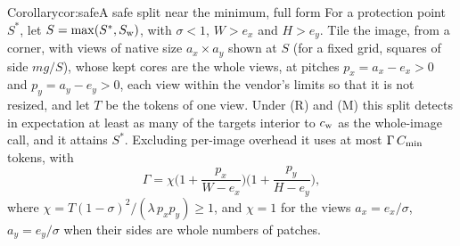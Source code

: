 \begin{restate}{Corollary}{cor:safe}{A safe split near the minimum, full form}
For a protection point $S^\ast$, let $S = \max(S^\ast, S_{\mathrm{w}})$, with $\sigma < 1$, $W > e_x$ and $H > e_y$. Tile the image, from a corner, with views of native size $a_x \times a_y$ shown at $S$ (for a fixed grid, squares of side $mg/S$), whose kept cores are the whole views, at pitches $p_x = a_x - e_x > 0$ and $p_y = a_y - e_y > 0$, each view within the vendor's limits so that it is not resized, and let $T$ be the tokens of one view. Under (R) and (M) this split detects in expectation at least as many of the targets interior to $c_{\mathrm{w}}$ as the whole-image call, and it attains $S^\ast$. Excluding per-image overhead it uses at most $\Gamma\,C_{\min}$ tokens, with
\[
\Gamma = \chi\Big(1+\frac{p_x}{W-e_x}\Big)\Big(1+\frac{p_y}{H-e_y}\Big),
\]
where $\chi = T(1-\sigma)^2/(\lambda\, p_x p_y) \ge 1$, and $\chi = 1$ for the views $a_x = e_x/\sigma$, $a_y = e_y/\sigma$ when their sides are whole numbers of patches.
\end{restate}

